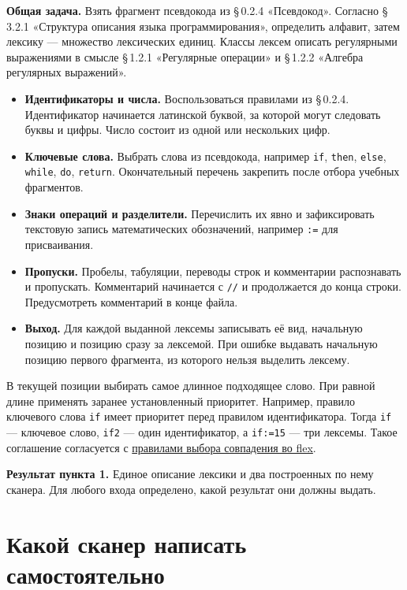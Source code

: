 \documentclass[12pt,a4paper]{article}
\newcommand{\parag}[1]{\S\,#1}
\newcommand{\code}[1]{\texttt{#1}}
\newcommand{\task}[1]{\par\medskip\noindent\textbf{#1}\quad}
\begin{document}
\task{Общая задача.} Взять фрагмент псевдокода из \parag{0.2.4} «Псевдокод». Согласно \parag{3.2.1} «Структура описания языка программирования», определить алфавит, затем лексику --- множество лексических единиц. Классы лексем описать регулярными выражениями в смысле \parag{1.2.1} «Регулярные операции» и \parag{1.2.2} «Алгебра регулярных выражений».
\begin{itemize}
\item \textbf{Идентификаторы и числа.} Воспользоваться правилами из \parag{0.2.4}. Идентификатор начинается латинской буквой, за которой могут следовать буквы и цифры. Число состоит из одной или нескольких цифр.
\item \textbf{Ключевые слова.} Выбрать слова из псевдокода, например \code{if}, \code{then}, \code{else}, \code{while}, \code{do}, \code{return}. Окончательный перечень закрепить после отбора учебных фрагментов.
\item \textbf{Знаки операций и разделители.} Перечислить их явно и зафиксировать текстовую запись математических обозначений, например \code{:=} для присваивания.
\item \textbf{Пропуски.} Пробелы, табуляции, переводы строк и комментарии распознавать и пропускать. Комментарий начинается с \code{//} и продолжается до конца строки. Предусмотреть комментарий в конце файла.
\item \textbf{Выход.} Для каждой выданной лексемы записывать её вид, начальную позицию и позицию сразу за лексемой. При ошибке выдавать начальную позицию первого фрагмента, из которого нельзя выделить лексему.
\end{itemize}

В текущей позиции выбирать самое длинное подходящее слово. При равной длине применять заранее установленный приоритет. Например, правило ключевого слова \code{if} имеет приоритет перед правилом идентификатора. Тогда \code{if} --- ключевое слово, \code{if2} --- один идентификатор, а \code{if:=15} --- три лексемы. Такое соглашение согласуется с \href{https://westes.github.io/flex/manual/Matching.html}{правилами выбора совпадения во flex}.

\task{Результат пункта 1.} Единое описание лексики и два построенных по нему сканера. Для любого входа определено, какой результат они должны выдать.

\section{Какой сканер написать самостоятельно}
\end{document}
